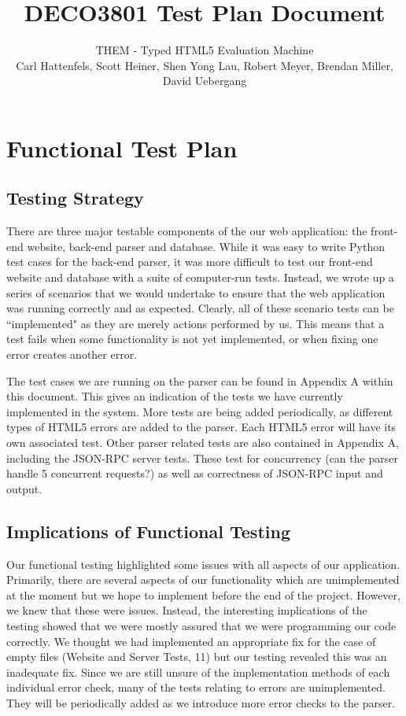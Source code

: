 \documentclass[10pt]{article}
\title{\bf DECO3801 Test Plan Document}
\author{\normalsize THEM - Typed HTML5 Evaluation Machine \\ \normalsize Carl Hattenfels, Scott Heiner, Shen Yong Lau, Robert Meyer, Brendan Miller, David Uebergang}
\date{}
\begin{document}
\maketitle

\section*{Functional Test Plan}

\subsection*{Testing Strategy}

There are three major testable components of the our web application: the front-end website, back-end parser and database. While it was easy to write Python test cases for the back-end parser, it was more difficult to test our front-end website and database with a suite of computer-run tests. Instead, we wrote up a series of scenarios that we would undertake to ensure that the web application was running correctly and as expected. Clearly, all of these scenario tests can be ``implemented" as they are merely actions performed by us. This means that a test fails when some functionality is not yet implemented, or when fixing one error creates another error.

The test cases we are running on the parser can be found in Appendix A within this document. This gives an indication of the tests we have currently implemented in the system. More tests are being added periodically, as different types of HTML5 errors are added to the parser. Each HTML5 error will have its own associated test. Other parser related tests are also contained in Appendix A, including the JSON-RPC server tests. These test for concurrency (can the parser handle 5 concurrent requests?) as well as correctness of JSON-RPC input and output.

\subsection*{Implications of Functional Testing}

Our functional testing highlighted some issues with all aspects of our application. Primarily, there are several aspects of our functionality which are unimplemented at the moment but we hope to implement before the end of the project. However, we knew that these were issues. Instead, the interesting implications of the testing showed that we were mostly assured that we were programming our code correctly. We thought we had implemented an appropriate fix for the case of empty files (Website and Server Tests, 11) but our testing revealed this was an inadequate fix. Since we are still unsure of the implementation methods of each individual error check, many of the tests relating to errors are unimplemented. They will be periodically added as we introduce more error checks to the parser.
\end{document}
